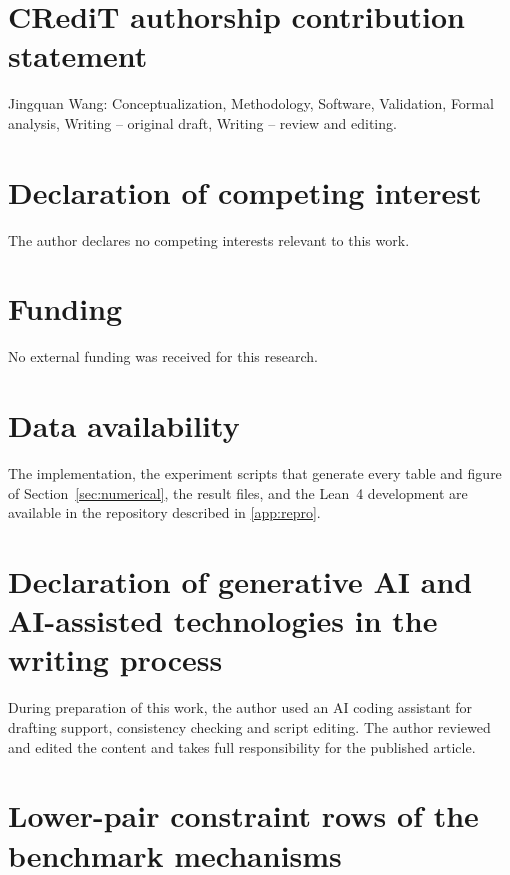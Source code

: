 \documentclass[preprint,12pt]{elsarticle}
\begin{document}
\section*{CRediT authorship contribution statement}

Jingquan Wang: Conceptualization, Methodology, Software, Validation, Formal analysis, Writing --
original draft, Writing -- review and editing.

\section*{Declaration of competing interest}

The author declares no competing interests relevant to this work.

\section*{Funding}

No external funding was received for this research.

\section*{Data availability}

The implementation, the experiment scripts that generate every table and figure of
Section~\ref{sec:numerical}, the result files, and the Lean~4 development are available in the
repository described in \ref{app:repro}.

\section*{Declaration of generative AI and AI-assisted technologies in the writing process}

During preparation of this work, the author used an AI coding assistant for drafting support,
consistency checking and script editing. The author reviewed and edited the content and takes full
responsibility for the published article.

\appendix

\section{Lower-pair constraint rows of the benchmark mechanisms}
\label{app:lower-pair}
\end{document}
